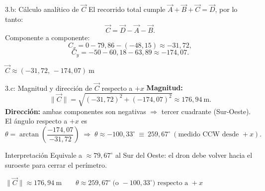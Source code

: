 \documentclass[letterpaper, 11pt]{article}
\begin{document}
\begin{paso}{3.b: C\'alculo anal\'itico de $\vec{C}$}
El recorrido total cumple $\vec{A}+\vec{B}+\vec{C}=\vec{D}$, por lo tanto:
\[
\vec{C}=\vec{D}-\vec{A}-\vec{B}.
\]
Componente a componente:
\[
C_x=0-79{,}86-(-48{,}15)\approx -31{,}72,
\]
\[
C_y=-50-60{,}18-63{,}89\approx -174{,}07 .
\]
\begin{resultado}\centering
$\displaystyle \vec{C}\approx(-31{,}72,\,-174{,}07)\ \mathrm{m}$
\end{resultado}
\end{paso}

\begin{paso}{3.c: Magnitud y direcci\'on de $\vec{C}$ respecto a $+x$}
\textbf{Magnitud:}
\[
\lVert\vec{C}\rVert=\sqrt{(-31{,}72)^2+(-174{,}07)^2}\approx 176{,}94\ \mathrm{m}.
\]
\textbf{Direcci\'on:} ambas componentes son negativas $\Rightarrow$ tercer cuadrante
(Sur-Oeste). El \'angulo respecto a $+x$ es
\[
\theta=\arctan\!\left(\frac{-174{,}07}{-31{,}72}\right)
\;\Rightarrow\;
\theta\approx -100{,}33^\circ\ \equiv\ 259{,}67^\circ\ (\text{medido CCW desde }+x).
\]
\begin{justif}{Interpretaci\'on}
Equivale a $\approx 79{,}67^\circ$ al Sur del Oeste: el dron debe volver hacia el
suroeste para cerrar el per\'imetro.
\end{justif}
\begin{resultado}\centering
$\displaystyle \lVert\vec{C}\rVert\approx 176{,}94\ \mathrm{m}\qquad
\theta\approx 259{,}67^\circ\ \text{(o } -100{,}33^\circ\text{) respecto a }+x$
\end{resultado}
\end{paso}
\end{document}
